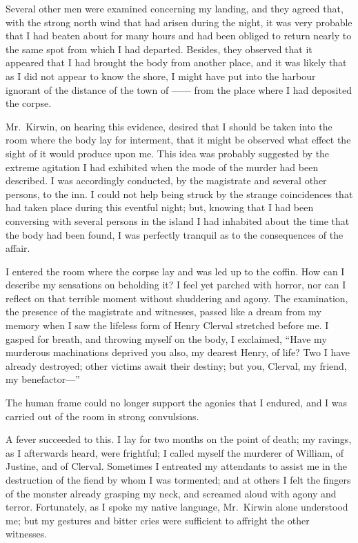 \documentclass[12pt,openright]{book}
\begin{document}
Several other men were examined concerning my landing, and they agreed that, with the strong north wind that had arisen during the night, it was very probable that I had beaten about for many hours and had been obliged to return nearly to the same spot from which I had departed. Besides, they observed that it appeared that I had brought the body from another place, and it was likely that as I did not appear to know the shore, I might have put into the harbour ignorant of the distance of the town of —— from the place where I had deposited the corpse.

Mr. Kirwin, on hearing this evidence, desired that I should be taken into the room where the body lay for interment, that it might be observed what effect the sight of it would produce upon me. This idea was probably suggested by the extreme agitation I had exhibited when the mode of the murder had been described. I was accordingly conducted, by the magistrate and several other persons, to the inn. I could not help being struck by the strange coincidences that had taken place during this eventful night; but, knowing that I had been conversing with several persons in the island I had inhabited about the time that the body had been found, I was perfectly tranquil as to the consequences of the affair.

I entered the room where the corpse lay and was led up to the coffin. How can I describe my sensations on beholding it? I feel yet parched with horror, nor can I reflect on that terrible moment without shuddering and agony. The examination, the presence of the magistrate and witnesses, passed like a dream from my memory when I saw the lifeless form of Henry Clerval stretched before me. I gasped for breath, and throwing myself on the body, I exclaimed, “Have my murderous machinations deprived you also, my dearest Henry, of life? Two I have already destroyed; other victims await their destiny; but you, Clerval, my friend, my benefactor—”

The human frame could no longer support the agonies that I endured, and I was carried out of the room in strong convulsions.

A fever succeeded to this. I lay for two months on the point of death; my ravings, as I afterwards heard, were frightful; I called myself the murderer of William, of Justine, and of Clerval. Sometimes I entreated my attendants to assist me in the destruction of the fiend by whom I was tormented; and at others I felt the fingers of the monster already grasping my neck, and screamed aloud with agony and terror. Fortunately, as I spoke my native language, Mr. Kirwin alone understood me; but my gestures and bitter cries were sufficient to affright the other witnesses.
\end{document}
